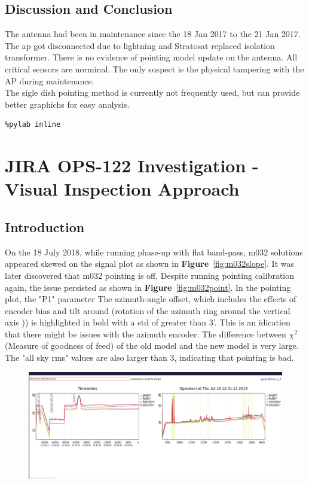 \documentclass{article}
\begin{document}
{\begin{appendices}
\begin{itemize}
\subsection{Discussion and Conclusion}
The antenna had been in maintenance since the 18 Jan 2017 to the 21 Jan 2017.  The ap got disconnected due to lightning and Stratosat replaced isolation transformer. There is no evidence of pointing model update on the antenna.  All critical sensors are norminal.  The only suspect is the physical tampering with the AP during maintenance. \\
The  sigle dish pointing method is currently not frequently used, but can provide better graphichs for easy analysis. 

	
	
\end{itemize}	  

\begin{verbatim}
%pylab inline

\end{verbatim}


\section{JIRA OPS-122 Investigation -Visual Inspection Approach }\label{sec.py2}
\subsection{Introduction}
On the 18 July 2018, while running phase-up with flat band-pass, m032 solutions appeared skewed on the signal plot as shown in \textbf{Figure}~\ref{fig:m032slope}. It was later discovered that m032 pointing is off. Despite running pointing calibration again, the issue persisted as shown in \textbf{Figure}~\ref{fig:m032point}.  In the pointing plot, the "P1" parameter The azimuth-angle offset, which includes the effects of encoder bias and tilt around (rotation of the azimuth ring around the vertical axis )) is highlighted in bold with a std of greater than 3'. This is an idication that there might be issues with the azimuth encoder.  The difference between $\chi^2$ (Measure of goodness of feed)  of the old model and the new model is very large. The "all sky rms" values are also larger than 3, indicating that pointing is bad.

\begin{figure}[H]
	\centering
	\includegraphics[scale=0.23]{m032_slope.png}
	

\end{figure}
\end{appendices}}
\end{document}
